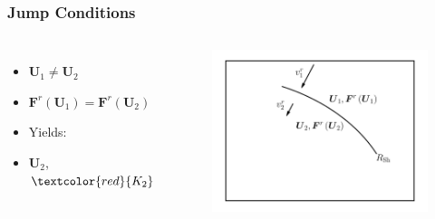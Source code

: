 \documentclass{beamer}
\newcommand{\red}{\textcolor{red}}
\newcommand{\bs}{\boldsymbol}
\begin{document}
\begin{frame}
\frametitle{Jump Conditions}

  \begin{columns}[c]


      \begin{itemize}[<+->]
        \item[]
          $\bs{U}_{1}\neq\bs{U}_{2}$
        \item[]
          $\bs{F}^{r}\left(\bs{U}_{1}\right)
          =\bs{F}^{r}\left(\bs{U}_{2}\right)$
        \item[]
          Yields:
        \item[]
          $\bs{U}_{2}$,$\red{K_{2}}$
      \end{itemize}


      \begin{figure}[htb!]
        \centering
        \includegraphics[width=\textwidth]{fig.jump.png}
      \end{figure}

  \end{columns}

\end{frame}
\end{document}
